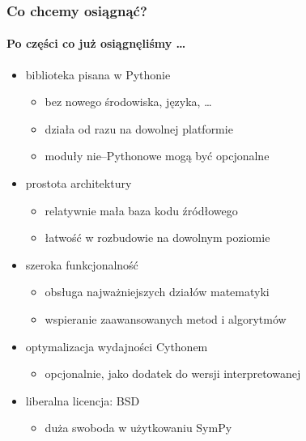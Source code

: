 \documentclass{beamer}
\begin{document}
\begin{frame}
    \frametitle{Co chcemy osiągnąć?}
    \framesubtitle{Po części co już osiągnęliśmy \ldots}

    \begin{itemize}
        \item biblioteka pisana w Pythonie
            \begin{itemize}
                \item bez nowego środowiska, języka, \ldots
                \item działa od razu na dowolnej platformie
                \item moduły nie--Pythonowe mogą być opcjonalne
            \end{itemize}
            \pause
        \item prostota architektury
            \begin{itemize}
                \item relatywnie mała baza kodu źródłowego
                \item łatwość w rozbudowie na dowolnym poziomie
            \end{itemize}
            \pause
        \item szeroka funkcjonalność
            \begin{itemize}
                \item obsługa najważniejszych działów matematyki
                \item wspieranie zaawansowanych metod i algorytmów
            \end{itemize}
            \pause
        \item optymalizacja wydajności Cythonem
            \begin{itemize}
                \item opcjonalnie, jako dodatek do wersji interpretowanej
            \end{itemize}
            \pause
        \item liberalna licencja: BSD
            \begin{itemize}
                \item duża swoboda w użytkowaniu SymPy
            \end{itemize}
    \end{itemize}
\end{frame}
\end{document}
